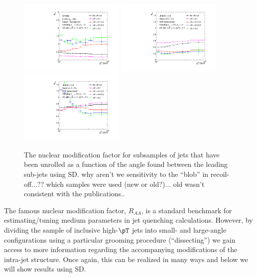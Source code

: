 \begin{figure}[th]
\centering
\includegraphics[width=0.45\textwidth]{figures/Observables_RAA/Plot9}%
\includegraphics[width=0.45\textwidth]{figures/Observables_RAA/Plot3}\\
\includegraphics[width=0.45\textwidth]{figures/Observables_RAA/Plot4}
\caption{The nuclear modification factor for subsamples of jets that have been unrolled as a function of the angle found between the leading sub-jets using SD. 
{\color{red} why aren't we sensitivity to the ``blob'' in recoil-off...?? which samples were used (new or old?)... old wasn't consistent with the publications..}
}
\label{fig:GroomedRAA}
\end{figure}
The famous nuclear modification factor, $R_{AA}$, is a standard benchmark for estimating/tuning medium parameters in jet quenching calculations. However, by dividing the sample of inclusive high-$\pT$ jets into small- and large-angle configurations using a particular grooming procedure (``dissecting'') we gain access to more information regarding the accompanying modifications of the intra-jet structure. Once again, this can be realized in many ways and below we will show results using SD.

